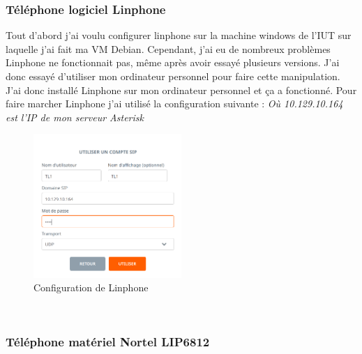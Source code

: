 \documentclass[12pt, a4paper]{article}
\begin{document}
	\subsubsection{Téléphone logiciel Linphone}
	Tout d'abord j'ai voulu configurer linphone sur la machine windows de l'IUT
	sur laquelle j'ai fait ma VM Debian. Cependant, j'ai eu de nombreux problèmes
	Linphone ne fonctionnait pas, même après avoir essayé plusieurs versions. 
	J'ai donc essayé d'utiliser mon ordinateur personnel pour faire cette 
	manipulation. J'ai donc installé Linphone sur mon ordinateur personnel et 
	ça a fonctionné. Pour faire marcher Linphone j'ai utilisé la configuration suivante : \textit{Où 10.129.10.164 est l'IP de mon serveur Asterisk}
	\begin{figure}[h]
		\centering
		\includegraphics[width=0.5\textwidth]{img/linphone.png}
		\caption{Configuration de Linphone}
		\label{fig:lin}
	\end{figure}\\

	\subsubsection{Téléphone matériel Nortel LIP6812}
\end{document}
